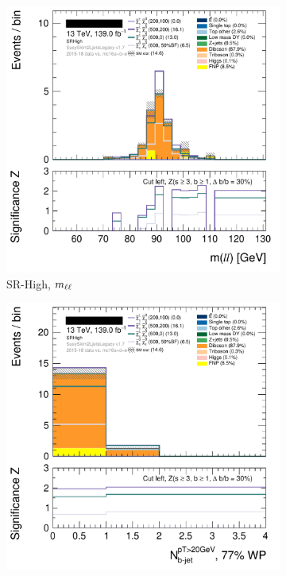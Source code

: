\begin{figure}[tp]
\centering
\begin{subfigure}{0.48\textwidth}
\centering
\includegraphics[width=\textwidth]{figures/2ljets_region_design_hist1d_mll_SRHigh.png}
\caption{SR-High, $m_{\ell\ell}$}
\end{subfigure}
\hfill
\begin{subfigure}{0.48\textwidth}
\centering
\includegraphics[width=\textwidth]{figures/2ljets_region_design_hist1d_nbtag_SRHigh.png}

\end{subfigure}
\end{figure}
